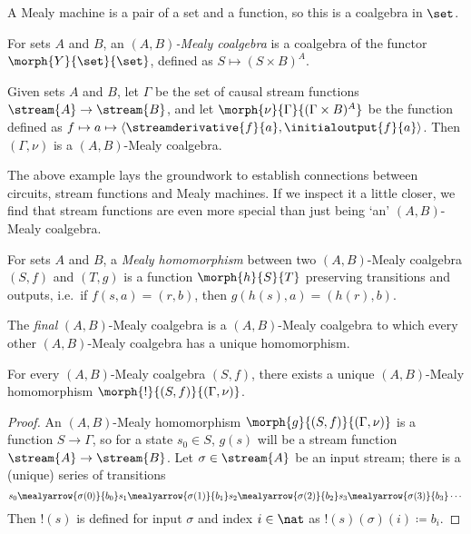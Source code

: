 A Mealy machine is a pair of a set
and a function, so this is a coalgebra in \(\set\).

\begin{definition}
    For sets \(A\) and \(B\), an \emph{\((A,B)\)-Mealy coalgebra} is a coalgebra
    of the functor \(\morph{Y}{\set}{\set}\), defined as
    \(S \mapsto (S \times B)^A\).
\end{definition}

\begin{example}
    Given sets \(A\) and \(B\), let \(\Gamma\) be the set of causal stream
    functions \(\stream{A} \to \stream{B}\), and let
    \(\morph{\nu}{\Gamma}{(\Gamma \times B)^A}\) be the function defined as \(
    f \mapsto a \mapsto \langle{
        \streamderivative{f}{a},\initialoutput{f}{a}
    }\rangle\).
    Then \((\Gamma,\nu)\) is a \((A,B)\)-Mealy coalgebra.
\end{example}

The above example lays the groundwork to establish connections between circuits,
stream functions and Mealy machines.
If we inspect it a little closer, we find that stream functions are even more
special than just being `an' \((A,B)\)-Mealy coalgebra.

\begin{definition}\label{def:mealy-homomorphism}
    For sets \(A\) and \(B\), a \emph{Mealy homomorphism} between two
    \((A,B)\)-Mealy coalgebra \((S,f)\) and \((T,g)\) is a function
    \(\morph{h}{S}{T}\) preserving transitions and
    outputs, i.e.\ if \(f(s,a) = (r,b)\), then \(g(h(s),a) = (h(r),b)\).
\end{definition}

The \emph{final} \((A,B)\)-Mealy coalgebra is a \((A,B)\)-Mealy coalgebra to
which every other \((A,B)\)-Mealy coalgebra has a unique homomorphism.

\begin{proposition}
    \label{prop:final-coalgebra}
    For every \((A,B)\)-Mealy coalgebra \((S,f)\), there exists a
    unique \((A,B)\)-Mealy homomorphism \(\morph{{!}}{(S,f)}{(\Gamma,\nu)}\).
\end{proposition}
\begin{proof}
    An \((A,B)\)-Mealy homomorphism \(\morph{g}{(S, f)}{(\Gamma, \nu)}\) is a
    function \(S \to \Gamma\), so for a state \(s_0 \in S\), \(g(s)\) will be a
    stream function \(\stream{A} \to \stream{B}\).
    Let \(\sigma \in \stream{A}\) be an input stream; there is a (unique) series
    of transitions \[
        s_0
        \mealyarrow{\sigma(0)}{b_0}
        s_1
        \mealyarrow{\sigma(1)}{b_1}
        s_2
        \mealyarrow{\sigma(2)}{b_2}
        s_3
        \mealyarrow{\sigma(3)}{b_3}
        \cdots
    \]
    Then \(!(s)\) is defined for input \(\sigma\) and
    index \(i \in \nat\) as \(!(s)(\sigma)(i) \coloneqq b_i\).
\end{proof}

